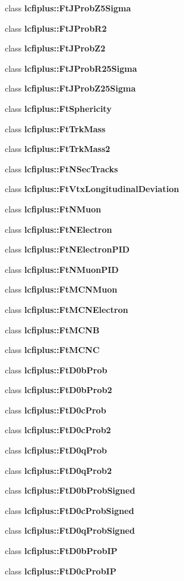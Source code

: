 \begin{DoxyCompactItemize}
class {\bf lcfiplus\-::\-Ft\-J\-Prob\-Z5\-Sigma}
\item 
class {\bf lcfiplus\-::\-Ft\-J\-Prob\-R2}
\item 
class {\bf lcfiplus\-::\-Ft\-J\-Prob\-Z2}
\item 
class {\bf lcfiplus\-::\-Ft\-J\-Prob\-R25\-Sigma}
\item 
class {\bf lcfiplus\-::\-Ft\-J\-Prob\-Z25\-Sigma}
\item 
class {\bf lcfiplus\-::\-Ft\-Sphericity}
\item 
class {\bf lcfiplus\-::\-Ft\-Trk\-Mass}
\item 
class {\bf lcfiplus\-::\-Ft\-Trk\-Mass2}
\item 
class {\bf lcfiplus\-::\-Ft\-N\-Sec\-Tracks}
\item 
class {\bf lcfiplus\-::\-Ft\-Vtx\-Longitudinal\-Deviation}
\item 
class {\bf lcfiplus\-::\-Ft\-N\-Muon}
\item 
class {\bf lcfiplus\-::\-Ft\-N\-Electron}
\item 
class {\bf lcfiplus\-::\-Ft\-N\-Electron\-P\-I\-D}
\item 
class {\bf lcfiplus\-::\-Ft\-N\-Muon\-P\-I\-D}
\item 
class {\bf lcfiplus\-::\-Ft\-M\-C\-N\-Muon}
\item 
class {\bf lcfiplus\-::\-Ft\-M\-C\-N\-Electron}
\item 
class {\bf lcfiplus\-::\-Ft\-M\-C\-N\-B}
\item 
class {\bf lcfiplus\-::\-Ft\-M\-C\-N\-C}
\item 
class {\bf lcfiplus\-::\-Ft\-D0b\-Prob}
\item 
class {\bf lcfiplus\-::\-Ft\-D0b\-Prob2}
\item 
class {\bf lcfiplus\-::\-Ft\-D0c\-Prob}
\item 
class {\bf lcfiplus\-::\-Ft\-D0c\-Prob2}
\item 
class {\bf lcfiplus\-::\-Ft\-D0q\-Prob}
\item 
class {\bf lcfiplus\-::\-Ft\-D0q\-Prob2}
\item 
class {\bf lcfiplus\-::\-Ft\-D0b\-Prob\-Signed}
\item 
class {\bf lcfiplus\-::\-Ft\-D0c\-Prob\-Signed}
\item 
class {\bf lcfiplus\-::\-Ft\-D0q\-Prob\-Signed}
\item 
class {\bf lcfiplus\-::\-Ft\-D0b\-Prob\-I\-P}
\item 
class {\bf lcfiplus\-::\-Ft\-D0c\-Prob\-I\-P}

\end{DoxyCompactItemize}
